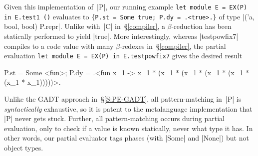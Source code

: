 Given this implementation of~|P|, our running example
\texttt{let module E = EX(P) in E.test1 ()} evaluates to
\texttt{\{P.st = Some true; P.dy = .<true>.\}}
of type |('a, bool, bool) P.repr|.  Unlike with~|C| in~\S\ref{compiler},
a $\beta$-reduction has been statically performed to yield |true|.  More
interestingly, whereas |testpowfix7| compiles to a code value with many
$\beta$-redexes in~\S\ref{compiler}, the partial evaluation
\texttt{let module E = EX(P) in E.testpowfix7}
gives the desired result
\vspace*{-0.7em}
\begin{code3}
{P.st = Some <fun>;
 P.dy = .<fun x_1 -> x_1 * (x_1 * (x_1 * (x_1 * (x_1 * (x_1 * x_1)))))>.}
\end{code3}
\vspace*{-0.7em}

\begin{comment}
Given this implementation of~|P|, our running example
\begin{code}
let module E = EX(P) in E.test1 ()
\end{code}
evaluates to
\begin{code}
{P.st = Some true; P.dy = .<true>.}
\end{code}
of type |('a, bool, bool) P.repr|.  Unlike with~|C| in~\S\ref{compiler},
a $\beta$-reduction has been statically performed to yield |true|.  More
interestingly, whereas |testpowfix7| compiles to a code value with many
$\beta$-redexes in~\S\ref{compiler}, the partial evaluation
\begin{code}
let module E = EX(P) in E.testpowfix7
\end{code}
gives the desired result
\begin{code}
{P.st = Some <fun>;
 P.dy = .<fun x_1 -> x_1 * (x_1 * (x_1 * (x_1 *
                    (x_1 * (x_1 * x_1)))))>.}
\end{code}
\end{comment}


Unlike the GADT approach in~\S\ref{S:PE-GADT}, all pattern\hyp matching
in~|P| is \emph{syntactically} exhaustive, so it is patent to the metalanguage
implementation that |P| never gets stuck.  Further, all pattern\hyp matching occurs
during partial evaluation, only to check if a value is known statically,
never what type it has.  In other words, our partial evaluator tags
phases (with |Some| and |None|) but not object types.
\begin{comment}
Our typed partial evaluator is online and polyvariant.  It reuses the
compiler~|C| and the evaluator~|R| by composing them.  This situation is
simpler than \citets{SperberThiemann:TwoForOne} composition of a partial
evaluator and a compiler, but the general ideas are similar.
\end{comment}


